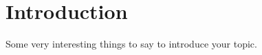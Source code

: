\chapter*{Introduction}

Some very interesting things to say to introduce your topic.


\lipsum[1-2]
